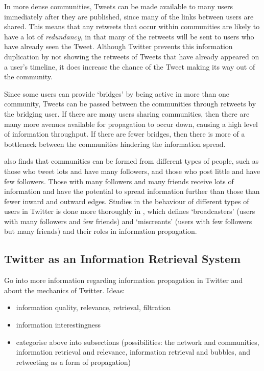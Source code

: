 In more dense communities, Tweets can be made available to many users immediately after they are published, since many of the links between users are shared. This means that any retweets that occur within communities are likely to have a lot of \textit{redundancy}, in that many of the retweets will be sent to users who have already seen the Tweet. Although Twitter prevents this information duplication by not showing the retweets of Tweets that have already appeared on a user's timeline, it does increase the chance of the Tweet making its way out of the community.

Since some users can provide `bridges' by being active in more than one community, Tweets can be passed between the communities through retweets by the bridging user. If there are many users sharing communities, then there are many more avenues available for propagation to occur down, causing a high level of information throughput. If there are fewer bridges, then there is more of a bottleneck between the communities hindering the information spread.

\cite{java07} also finds that communities  can be formed from different types of people, such as those who tweet lots and have many followers, and those who post little and have few followers. Those with many followers and many friends receive lots of information and have the potential to spread information further than those than fewer inward and outward edges. Studies in the behaviour of different types of users in Twitter is done more thoroughly in \cite{krish08}, which defines `broadcasters' (users with many followers and few friends) and `miscreants' (users with few followers but many friends) and their roles in information propagation.


\subsection{Twitter as an Information Retrieval System}

Go into more information regarding information propagation in Twitter and about the mechanics of Twitter. Ideas:
\begin{itemize}
\item information quality, relevance, retrieval, filtration
\item information interestingness
\item categorise above into subsections (possibilities: the network and communities, information retrieval and relevance, information retrieval and bubbles, and retweeting as a form of propagation)
\end{itemize}


